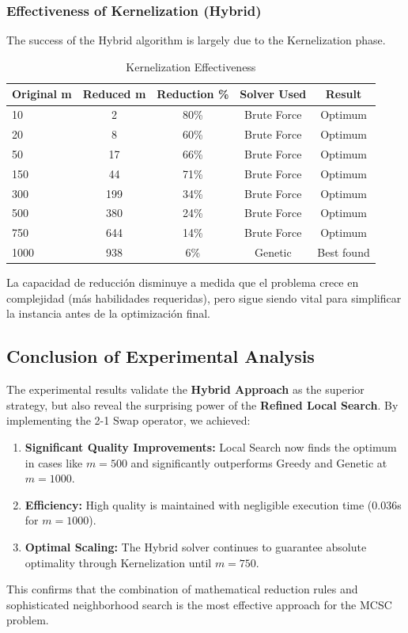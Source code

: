 \subsubsection{Effectiveness of Kernelization (Hybrid)}

The success of the Hybrid algorithm is largely due to the Kernelization phase.

\begin{table}[H]
\centering
\caption{Kernelization Effectiveness}
\label{tab:kernel-breakdown}
\begin{tabular}{@{}lcccc@{}}
\toprule
\textbf{Original m} & \textbf{Reduced m} & \textbf{Reduction \%} & \textbf{Solver Used} & \textbf{Result} \\
\midrule
10 & 2 & 80\% & Brute Force & Optimum \\
20 & 8 & 60\% & Brute Force & Optimum \\
50 & 17 & 66\% & Brute Force & Optimum \\
150 & 44 & 71\% & Brute Force & Optimum \\
300 & 199 & 34\% & Brute Force & Optimum \\
500 & 380 & 24\% & Brute Force & Optimum \\
750 & 644 & 14\% & Brute Force & Optimum \\
1000 & 938 & 6\% & Genetic & Best found \\
\bottomrule
\end{tabular}
\end{table}

La capacidad de reducción disminuye a medida que el problema crece en complejidad (más habilidades requeridas), pero sigue siendo vital para simplificar la instancia antes de la optimización final.

\subsection{Conclusion of Experimental Analysis}
\label{subsec:experimental-conclusion}

The experimental results validate the \textbf{Hybrid Approach} as the superior strategy, but also reveal the surprising power of the \textbf{Refined Local Search}. By implementing the 2-1 Swap operator, we achieved:
\begin{enumerate}
    \item \textbf{Significant Quality Improvements:} Local Search now finds the optimum in cases like $m=500$ and significantly outperforms Greedy and Genetic at $m=1000$.
    \item \textbf{Efficiency:} High quality is maintained with negligible execution time (0.036s for $m=1000$).
    \item \textbf{Optimal Scaling:} The Hybrid solver continues to guarantee absolute optimality through Kernelization until $m=750$.
\end{enumerate}
This confirms that the combination of mathematical reduction rules and sophisticated neighborhood search is the most effective approach for the MCSC problem.
